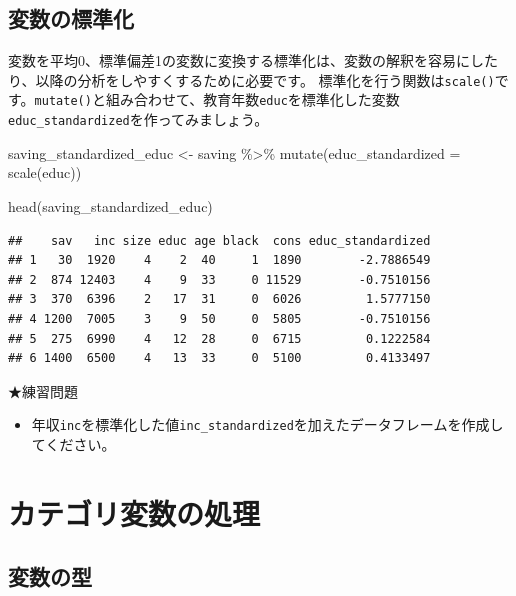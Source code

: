 \documentclass[
]{book}
\newenvironment{Shaded}{\begin{snugshade}}{\end{snugshade}}
\newcommand{\AttributeTok}[1]{\textcolor[rgb]{0.77,0.63,0.00}{#1}}
\newcommand{\FunctionTok}[1]{\textcolor[rgb]{0.00,0.00,0.00}{#1}}
\newcommand{\NormalTok}[1]{#1}
\newcommand{\OtherTok}[1]{\textcolor[rgb]{0.56,0.35,0.01}{#1}}
\newcommand{\SpecialCharTok}[1]{\textcolor[rgb]{0.00,0.00,0.00}{#1}}
\providecommand{\tightlist}{%
  \setlength{\itemsep}{0pt}\setlength{\parskip}{0pt}}
\begin{document}
\hypertarget{ux5909ux6570ux306eux6a19ux6e96ux5316}{%
\subsection{変数の標準化}\label{ux5909ux6570ux306eux6a19ux6e96ux5316}}

変数を平均0、標準偏差1の変数に変換する標準化は、変数の解釈を容易にしたり、以降の分析をしやすくするために必要です。
標準化を行う関数は\texttt{scale()}です。\texttt{mutate()}と組み合わせて、教育年数\texttt{educ}を標準化した変数\texttt{educ\_standardized}を作ってみましょう。

\begin{Shaded}
\begin{Highlighting}[]
\NormalTok{saving\_standardized\_educ }\OtherTok{\textless{}{-}}
\NormalTok{  saving }\SpecialCharTok{\%\textgreater{}\%}
    \FunctionTok{mutate}\NormalTok{(}\AttributeTok{educ\_standardized =} \FunctionTok{scale}\NormalTok{(educ))}

\FunctionTok{head}\NormalTok{(saving\_standardized\_educ)}
\end{Highlighting}
\end{Shaded}

\begin{verbatim}
##    sav   inc size educ age black  cons educ_standardized
## 1   30  1920    4    2  40     1  1890        -2.7886549
## 2  874 12403    4    9  33     0 11529        -0.7510156
## 3  370  6396    2   17  31     0  6026         1.5777150
## 4 1200  7005    3    9  50     0  5805        -0.7510156
## 5  275  6990    4   12  28     0  6715         0.1222584
## 6 1400  6500    4   13  33     0  5100         0.4133497
\end{verbatim}

★練習問題

\begin{itemize}
\tightlist
\item
  年収\texttt{inc}を標準化した値\texttt{inc\_standardized}を加えたデータフレームを作成してください。
\end{itemize}

\hypertarget{ux30abux30c6ux30b4ux30eaux5909ux6570ux306eux51e6ux7406}{%
\section{カテゴリ変数の処理}\label{ux30abux30c6ux30b4ux30eaux5909ux6570ux306eux51e6ux7406}}

\hypertarget{ux5909ux6570ux306eux578b}{%
\subsection{変数の型}\label{ux5909ux6570ux306eux578b}}
\end{document}
